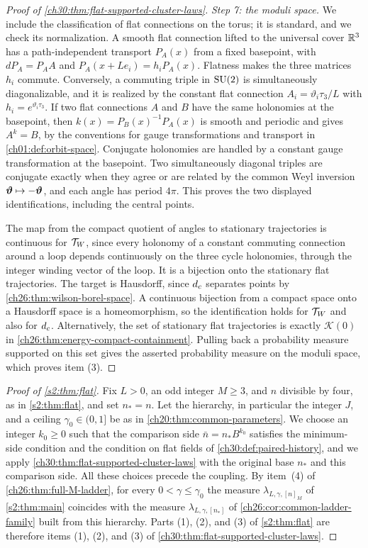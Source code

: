 \begin{proof}[Proof of \cref{ch30:thm:flat-supported-cluster-laws}]
\emph{Step 7: the moduli space.} We include the classification of flat connections on the torus; it is standard, and we check its normalization. A smooth flat connection lifted to the universal cover $\mathbb R^3$ has a path-independent transport $P_A(x)$ from a fixed basepoint, with $dP_A=P_AA$ and $P_A(x+Le_i)=h_iP_A(x)$. Flatness makes the three matrices $h_i$ commute. Conversely, a commuting triple in $\mathrm{SU}(2)$ is simultaneously diagonalizable, and it is realized by the constant flat connection $A_i=\vartheta_i\tau_3/L$ with $h_i=e^{\vartheta_i\tau_3}$. If two flat connections $A$ and $B$ have the same holonomies at the basepoint, then $k(x)=P_B(x)^{-1}P_A(x)$ is smooth and periodic and gives $A^k=B$, by the conventions for gauge transformations and transport in \cref{ch01:def:orbit-space}. Conjugate holonomies are handled by a constant gauge transformation at the basepoint. Two simultaneously diagonal triples are conjugate exactly when they agree or are related by the common Weyl inversion $\bm\vartheta\mapsto-\bm\vartheta$, and each angle has period $4\pi$. This proves the two displayed identifications, including the central points.

The map from the compact quotient of angles to stationary trajectories is continuous for $\mathcal T_W$, since every holonomy of a constant commuting connection around a loop depends continuously on the three cycle holonomies, through the integer winding vector of the loop. It is a bijection onto the stationary flat trajectories. The target is Hausdorff, since $d_c$ separates points by \cref{ch26:thm:wilson-borel-space}. A continuous bijection from a compact space onto a Hausdorff space is a homeomorphism, so the identification holds for $\mathcal T_W$ and also for $d_c$. Alternatively, the set of stationary flat trajectories is exactly $\mathcal K(0)$ in \cref{ch26:thm:energy-compact-containment}. Pulling back a probability measure supported on this set gives the asserted probability measure on the moduli space, which proves item (3).
\end{proof}

\begin{proof}[Proof of \cref{s2:thm:flat}]
Fix $L>0$, an odd integer $M\ge3$, and $n$ divisible by four, as in \cref{s2:thm:flat}, and set $n_*=n$. Let the hierarchy, in particular the integer $J$, and a ceiling $\gamma_0\in(0,1]$ be as in \cref{ch20:thm:common-parameters}. We choose an integer $k_0\ge0$ such that the comparison side $\bar n=n_*B^{k_0}$ satisfies the minimum-side condition and the condition on flat fields of \cref{ch30:def:paired-history}, and we apply \cref{ch30:thm:flat-supported-cluster-laws} with the original base $n_*$ and this comparison side. All these choices precede the coupling. By item~(4) of \cref{ch26:thm:full-M-ladder}, for every $0<\gamma\le\gamma_0$ the measure $\lambda_{L,\gamma,[n]_M}$ of \cref{s2:thm:main} coincides with the measure $\lambda_{L,\gamma,[n_*]}$ of \cref{ch26:cor:common-ladder-family} built from this hierarchy. Parts (1), (2), and (3) of \cref{s2:thm:flat} are therefore items (1), (2), and (3) of \cref{ch30:thm:flat-supported-cluster-laws}.
\end{proof}
